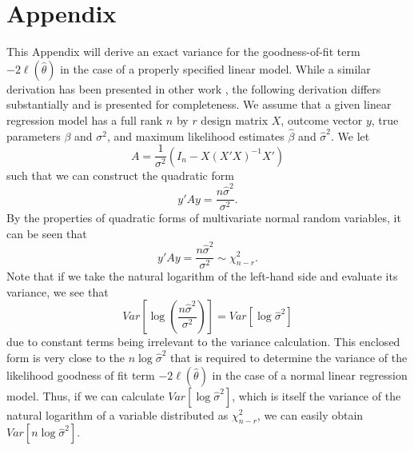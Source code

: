 \documentclass[submit]{smj}
\begin{document}


\appendix
\section*{Appendix}
This Appendix will derive an exact variance for the goodness-of-fit term $-2 \ell (\hat{\theta} )$ in the case of a properly specified
linear model. While a similar derivation has been presented in other work \citep{McQuarrie}, the following derivation differs substantially and is presented for completeness.
We assume that a given linear regression model has a full rank $n$ by $r$ design matrix $X$, outcome vector $y$, true parameters $\beta$ and $\sigma^2$,
and maximum likelihood estimates $\hat{\beta}$ and $\hat{\sigma}^2$. We let
\begin{equation*}
	A = \frac{1}{\sigma^2} (I_n - X(X'X)^{-1}X') 
\end{equation*}
such that we can construct the quadratic form
\begin{equation*}
	y'Ay = \frac{n \hat{\sigma}^2}{\sigma^2} .
\end{equation*}
By the properties of quadratic forms of multivariate normal random variables, it can be seen that
\begin{equation}
	y'Ay = \frac{n \hat{\sigma}^2}{\sigma^2} \sim \chi^2_{n-r} .
\end{equation}
Note that if we take the natural logarithm of the left-hand side and evaluate its variance, we see that
\begin{equation}
	Var \left[ \log(\frac{n \hat{\sigma}^2}{\sigma^2}) \right]  = Var \left[ \log \hat{\sigma}^2 \right]
\end{equation}
due to constant terms being irrelevant to the variance calculation. This enclosed form is very close to the $n \log \hat{\sigma}^2$ that is required
to determine the variance of the likelihood goodness of fit term $-2 \ell (\hat{\theta} )$ in the case of a normal linear regression model.
Thus, if we can calculate $Var \left[ \log \hat{\sigma}^2 \right]$, which is itself the variance
of the natural logarithm of a variable distributed as $\chi^2_{n-r}$, we can easily obtain $Var \left[ n \log \hat{\sigma}^2 \right]$.
\end{document}
